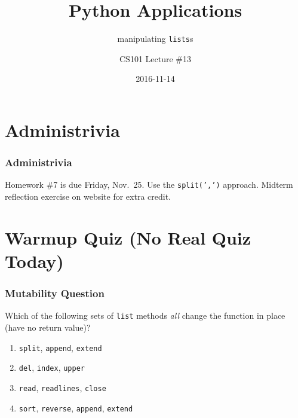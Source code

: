 \documentclass[11pt]{beamer}
\title{Python Applications}
\subtitle{manipulating \texttt{lists}s}
\author{CS101 Lecture \#13}
\date{2016-11-14}
\begin{document}
  \setcounter{showProgressBar}{0}
  \setcounter{showSlideNumbers}{0}

\frame{\titlepage}

\setcounter{framenumber}{0}
\setcounter{showProgressBar}{1}
\setcounter{showSlideNumbers}{1}

\section{Administrivia}

\begin{frame}
  \frametitle{Administrivia}
  \Enlarge

  \begin{itemize}
  \myitem  Homework \#7 is due Friday, Nov.\ 25.
  \mysubitem  Use the \texttt{split(',')} approach.
  \myitem  Midterm reflection exercise on website for extra credit.
  \end{itemize}
\end{frame}


\section{Warmup Quiz (No Real Quiz Today)}

\begin{frame}[fragile]
  \frametitle{Mutability Question}
  \Enlarge

  Which of the following sets of \texttt{list} methods \emph{all} change the function in place (have no return value)?

  \begin{enumerate}[label=\Alph*]
  \item  \texttt{split}, \texttt{append}, \texttt{extend}
  \item  \texttt{del}, \texttt{index}, \texttt{upper}
  \item  \texttt{read}, \texttt{readlines}, \texttt{close}
  \item  \texttt{sort}, \texttt{reverse}, \texttt{append}, \texttt{extend}
  \end{enumerate}
\end{frame}
\end{document}
